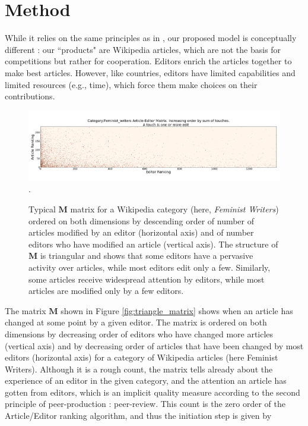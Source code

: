 \section{Method}
While it relies on the same principles as in \cite{caldarelli2012network}, our proposed model is conceptually different : our ``products" are Wikipedia articles, which are not the basis for competitions but rather for cooperation. Editors enrich the articles together to make best articles. However, like countries, editors have limited capabilities and limited resources (e.g., time), which force them make choices on their contributions.

\begin{figure}[!t]
\centering
\includegraphics[width=2.0\columnwidth]{Figures/Category_Feminist_writerstriangle_matrix_corrected.png}.
\caption{Typical $\mathbf{M}$ matrix for a Wikipedia category (here, {\it Feminist Writers}) ordered on both dimensions by descending order of number of articles modified by an editor (horizontal axis) and of number editors who have modified an article (vertical axis). The structure of $\mathbf{M}$ is triangular and shows that some editors have a pervasive activity over articles, while most editors edit only a few. Similarly, some articles receive widespread attention by editors, while most articles are modified only by a few editors.}
\label{fig:convergence}
\end{figure}


The matrix $\mathbf{M}$ shown in Figure \ref{fig:triangle_matrix} shows when an article has changed at some point by a given editor. The matrix is ordered on both dimensions by decreasing order of editors who have changed more articles (vertical axis) and by decreasing order of articles that have been changed by most editors (horizontal axis) for a category of Wikipedia articles (here Feminist Writers). Although it is a rough count, the matrix tells already about the experience of an editor in the given category, and the attention an article has gotten from editors, which is an implicit quality measure according to the second principle of peer-production : peer-review. This count is the zero order of the Article/Editor ranking algorithm, and thus the initiation step is given by 

